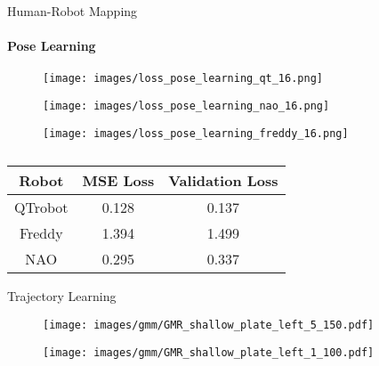 \documentclass[aspectratio=169]{beamer}
\begin{document}
\begin{frame}{Human-Robot Mapping}
	\framesubtitle{Pose Learning}
	\vspace{-0.2cm}
	\begin{minipage}{0.5\linewidth}
		\begin{figure}[h]
			\texttt{[image: images/loss\_pose\_learning\_qt\_16.png]}
		\end{figure}
		\vspace{-0.6cm}
		\begin{figure}[h]
			\texttt{[image: images/loss\_pose\_learning\_nao\_16.png]}
		\end{figure}
	\end{minipage}\hfill	
	\begin{minipage}{0.5\linewidth}	
		\begin{figure}[h]
			\texttt{[image: images/loss\_pose\_learning\_freddy\_16.png]}
		\end{figure}
		\begin{table}[!b]
			\small
			\begin{tabular}{||c|c|c||}
				\hline
				Robot        &  MSE Loss  & Validation Loss    \\ \hline
				QTrobot      &   0.128    & 	0.137  		   \\ \hline
				Freddy 	     &   1.394    & 	1.499 	 	   \\ \hline
				NAO			 &   0.295    & 	0.337  		   \\ \hline
			\end{tabular}
			\caption {}
		\end{table}
	\end{minipage}
\end{frame}

\begin{frame}{Trajectory Learning}
	\begin{minipage}{0.49\linewidth}
		\centering	
		\begin{figure}[h!]
			\texttt{[image: images/gmm/GMR\_shallow\_plate\_left\_5\_150.pdf]}
		\end{figure}
	\end{minipage}		
	\begin{minipage}{0.49\linewidth}
		\centering	
		\begin{figure}[h!]
			\texttt{[image: images/gmm/GMR\_shallow\_plate\_left\_1\_100.pdf]}
		\end{figure}
	\end{minipage}	
\end{frame}
\end{document}
